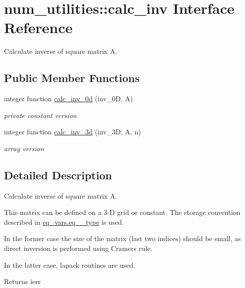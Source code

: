 \hypertarget{interfacenum__utilities_1_1calc__inv}{}\section{num\+\_\+utilities\+:\+:calc\+\_\+inv Interface Reference}
\label{interfacenum__utilities_1_1calc__inv}


Calculate inverse of square matrix {\ttfamily A}.  


\subsection*{Public Member Functions}
\begin{DoxyCompactItemize}
\item 
integer function \hyperlink{interfacenum__utilities_1_1calc__inv_a3581b6eb00529911a3432d38a38e0711}{calc\+\_\+inv\+\_\+0d} (inv\+\_\+0D, A)
\begin{DoxyCompactList}\small\item\em private constant version \end{DoxyCompactList}\item 
integer function \hyperlink{interfacenum__utilities_1_1calc__inv_a4b69812ab794c50fd8a53aa0117b531e}{calc\+\_\+inv\+\_\+3d} (inv\+\_\+3D, A, n)
\begin{DoxyCompactList}\small\item\em array version \end{DoxyCompactList}\end{DoxyCompactItemize}


\subsection{Detailed Description}
Calculate inverse of square matrix {\ttfamily A}. 

This matrix can be defined on a 3-\/D grid or constant. The storage convention described in \hyperlink{structeq__vars_1_1eq__2__type}{eq\+\_\+vars.\+eq\+\_\+\_\+type} is used.

In the former case the size of the matrix (last two indices) should be small, as direct inversion is performed using Cramer\textquotesingle{}s rule.

In the latter case, lapack routines are used.

\begin{DoxyReturn}{Returns}
ierr 
\end{DoxyReturn}


